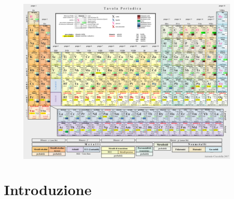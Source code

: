 \documentclass[12pt]{book}%
\newcommand\blankpage{%
    \null
    \thispagestyle{empty}%
    \newpage}
\begin{document}
\begin{figure}[H]
    \includegraphics[angle=90,origin=c]{immagini/tavola periodica.png}
\end{figure}

\afterpage{\blankpage}


\clearpage                       %
{                                %
  \pagestyle{empty}              %
  {
    \fancyhf{}%
    \renewcommand{\headrulewidth}{0pt}%
    \renewcommand{\footrulewidth}{0pt}%
  }
  \tableofcontents
  \thispagestyle{empty}          %
} %

\newpage

\pagestyle{fancy}
\fancyhf{}
\fancyhead[LE]{\nouppercase{\textbf{\thepage}\hfill\leftmark}}
\fancyhead[RO]{\nouppercase{\rightmark\hfill\textbf{\thepage}}}


\thispagestyle{empty}
\chapter*{Introduzione}
\end{document}
